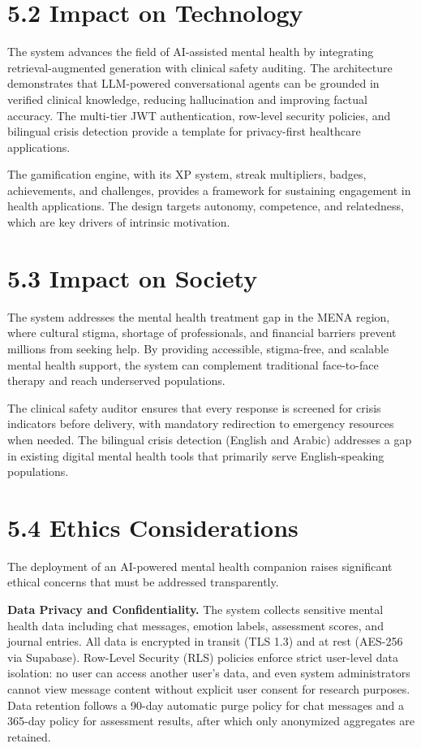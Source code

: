 \documentclass[
  letterpaper,
  12pt,
  a4paper,
  openany]{report}
\begin{document}
\section{5.2 Impact on Technology}\label{impact-on-technology}

The system advances the field of AI-assisted mental health by
integrating retrieval-augmented generation with clinical safety
auditing. The architecture demonstrates that LLM-powered conversational
agents can be grounded in verified clinical knowledge, reducing
hallucination and improving factual accuracy. The multi-tier JWT
authentication, row-level security policies, and bilingual crisis
detection provide a template for privacy-first healthcare applications.

The gamification engine, with its XP system, streak multipliers, badges,
achievements, and challenges, provides a framework for sustaining
engagement in health applications. The design targets autonomy,
competence, and relatedness, which are key drivers of intrinsic
motivation.

\section{5.3 Impact on Society}\label{impact-on-society}

The system addresses the mental health treatment gap in the MENA region,
where cultural stigma, shortage of professionals, and financial barriers
prevent millions from seeking help. By providing accessible,
stigma-free, and scalable mental health support, the system can
complement traditional face-to-face therapy and reach underserved
populations.

The clinical safety auditor ensures that every response is screened for
crisis indicators before delivery, with mandatory redirection to
emergency resources when needed. The bilingual crisis detection (English
and Arabic) addresses a gap in existing digital mental health tools that
primarily serve English-speaking populations.

\section{5.4 Ethics Considerations}\label{ethics-considerations}

The deployment of an AI-powered mental health companion raises
significant ethical concerns that must be addressed transparently.

\textbf{Data Privacy and Confidentiality.} The system collects sensitive
mental health data including chat messages, emotion labels, assessment
scores, and journal entries. All data is encrypted in transit (TLS 1.3)
and at rest (AES-256 via Supabase). Row-Level Security (RLS) policies
enforce strict user-level data isolation: no user can access another
user's data, and even system administrators cannot view message content
without explicit user consent for research purposes. Data retention
follows a 90-day automatic purge policy for chat messages and a 365-day
policy for assessment results, after which only anonymized aggregates
are retained.
\end{document}

